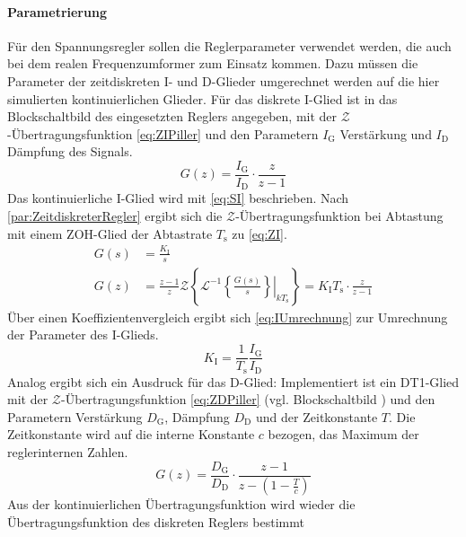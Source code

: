 \paragraph{Parametrierung} Für den Spannungsregler sollen die Reglerparameter verwendet werden, die auch bei dem realen Frequenzumformer zum Einsatz kommen. Dazu müssen die Parameter der zeitdiskreten I- und D-Glieder umgerechnet werden auf die hier simulierten kontinuierlichen Glieder. Für das diskrete I-Glied ist in \cite{pillerpowersystemsPILLERUniversityRegelungstechnik} das Blockschaltbild des eingesetzten Reglers angegeben, mit der $\mathcal{Z}$-Übertragungsfunktion \cref{eq:ZIPiller} und den Parametern $I_\mathrm{G}$ Verstärkung und $I_\mathrm{D}$ Dämpfung des Signals.
\begin{equation}
	\label{eq:ZIPiller}
	G(z) = \frac{I_\mathrm{G}}{I_\mathrm{D}}\cdot\frac{z}{z-1}
\end{equation}
Das kontinuierliche I-Glied wird mit \cref{eq:SI} beschrieben. Nach \cref{par:ZeitdiskreterRegler} ergibt sich die $\mathcal{Z}$-Übertragungsfunktion bei Abtastung mit einem ZOH-Glied der Abtastrate $T_\mathrm{s}$ zu \cref{eq:ZI}.
\begin{align}
	G(s) &= \frac{K_\mathrm{I}}{s} \label{eq:SI}\\
	G(z) &= \frac{z-1}{z} \mathcal{Z}\left\{ \mathcal{L}^{-1}\left.\left\{\frac{G(s)}{s}\right\}\right|_{kT_{\mathrm{s}}} \right\} = K_\mathrm{I}T_\mathrm{s}\cdot\frac{z}{z-1} \label{eq:ZI}
\end{align}
Über einen Koeffizientenvergleich ergibt sich \cref{eq:IUmrechnung} zur Umrechnung der Parameter des I-Glieds.
\begin{equation}
	K_\mathrm{I} = \frac{1}{T_\mathrm{s}}\frac{I_\mathrm{G}}{I_\mathrm{D}}\label{eq:IUmrechnung}
\end{equation}
Analog ergibt sich ein Ausdruck für das D-Glied: Implementiert ist ein DT1-Glied mit der $\mathcal{Z}$-Übertragungsfunktion \cref{eq:ZDPiller} (vgl. Blockschaltbild \cite{pillerpowersystemsPILLERUniversityRegelungstechnik}) und den Parametern Verstärkung $D_\mathrm{G}$, Dämpfung $D_\mathrm{D}$ und der Zeitkonstante $T$. Die Zeitkonstante wird auf die interne Konstante $c$ bezogen, das Maximum der reglerinternen Zahlen.
\begin{equation}
	G(z) = \frac{D_\mathrm{G}}{D_\mathrm{D}}\cdot\frac{z-1}{z-(1-\frac{T}{c})}\label{eq:ZDPiller}
\end{equation}
Aus der kontinuierlichen Übertragungsfunktion wird wieder die Übertragungsfunktion des diskreten Reglers bestimmt 
